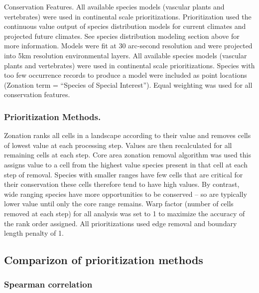 \documentclass[]{article}
\begin{document}
Conservation Features. All available species models (vascular plants and vertebrates) were used in continental scale prioritizations. Prioritization used the continuous value output of species distribution models for current climates and projected future climates. See species distribution modeling section above for more information. Models were fit at 30 arc-second resolution and were projected into 5km resolution environmental layers. All available species models (vascular plants and vertebrates) were used in continental scale prioritizations. Species with too few occurrence records to produce a model were included as point locations (Zonation term = ``Species of Special Interest''). Equal weighting was used for all conservation features.

\hypertarget{prioritization-methods.}{%
\subsubsection{Prioritization Methods.}\label{prioritization-methods.}}

Zonation ranks all cells in a landscape according to their value and removes cells of lowest value at each processing step. Values are then recalculated for all remaining cells at each step. Core area zonation removal algorithm was used this assigns value to a cell from the highest value species present in that cell at each step of removal. Species with smaller ranges have few cells that are critical for their conservation these cells therefore tend to have high values. By contrast, wide ranging species have more opportunities to be conserved -- so are typically lower value until only the core range remains. Warp factor (number of cells removed at each step) for all analysis was set to 1 to maximize the accuracy of the rank order assigned. All prioritizations used edge removal and boundary length penalty of 1.

\hypertarget{comparizon-of-prioritization-methods}{%
\subsection{Comparizon of prioritization methods}\label{comparizon-of-prioritization-methods}}

\hypertarget{spearman-correlation}{%
\subsubsection{Spearman correlation}\label{spearman-correlation}}
\end{document}
